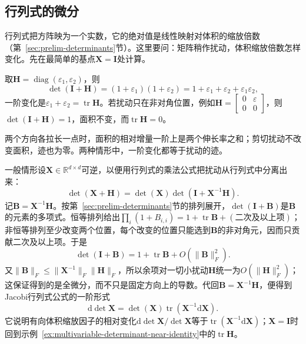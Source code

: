 \subsection{行列式的微分}
行列式把方阵映为一个实数，它的绝对值是线性映射对体积的缩放倍数（第~\ref{sec:prelim-determinants}节）。这里要问：矩阵稍作扰动，体积缩放倍数怎样变化。先在最简单的基点$\bm X=\bm I$处计算。
\begin{example}[单位矩阵附近行列式的一阶变化]
\label{ex:multivariable-determinant-near-identity}
取$\bm H=\operatorname{diag}(\varepsilon_1,\varepsilon_2)$，则
\[
 \det(\bm I+\bm H)=(1+\varepsilon_1)(1+\varepsilon_2)=1+\varepsilon_1+\varepsilon_2+\varepsilon_1\varepsilon_2,
\]
一阶变化是$\varepsilon_1+\varepsilon_2=\operatorname{tr}\bm H$。若扰动只在非对角位置，例如$\bm H=\begin{bmatrix}0&\varepsilon\\0&0\end{bmatrix}$，则$\det(\bm I+\bm H)=1$，面积不变，而$\operatorname{tr}\bm H=0$。
\end{example}

两个方向各拉长一点时，面积的相对增量一阶上是两个伸长率之和；剪切扰动不改变面积，迹也为零。两种情形中，一阶变化都等于扰动的迹。

一般情形设$\bm X\in\mathbb R^{d\times d}$可逆，以便用行列式的乘法公式把扰动从行列式中分离出来：
\[
 \det(\bm X+\bm H)=\det(\bm X)\det(\bm I+\bm X^{-1}\bm H).
\]
记$\bm B=\bm X^{-1}\bm H$。按第~\ref{sec:prelim-determinants}节的排列展开，$\det(\bm I+\bm B)$是$\bm B$的元素的多项式。恒等排列给出$\prod_i(1+B_{i,i})=1+\operatorname{tr}\bm B+(\text{二次及以上项})$；非恒等排列至少改变两个位置，每个改变的位置只能选到$\bm B$的非对角元，因而只贡献二次及以上项。于是
\[
 \det(\bm I+\bm B)=1+\operatorname{tr}\bm B+O(\lVert\bm B\rVert_F^2).
\]
又$\lVert\bm B\rVert_F\leq\lVert\bm X^{-1}\rVert_F\lVert\bm H\rVert_F$，所以余项对一切小扰动$\bm H$统一为$O(\lVert\bm H\rVert_F^2)$；这保证得到的是全微分，而不只是固定方向上的导数。代回$\bm B=\bm X^{-1}\bm H$，便得到Jacobi行列式公式的一阶形式
\[
 \mathrm{d}\det\bm{X}=\det(\bm{X})\operatorname{tr}(\bm{X}^{-1}\mathrm{d}\bm{X}).
\]
它说明有向体积缩放因子的相对变化$\mathrm d\det\bm X/\det\bm X$等于$\operatorname{tr}(\bm X^{-1}\mathrm d\bm X)$；$\bm X=\bm I$时回到示例~\ref{ex:multivariable-determinant-near-identity}中的$\operatorname{tr}\bm H$。

